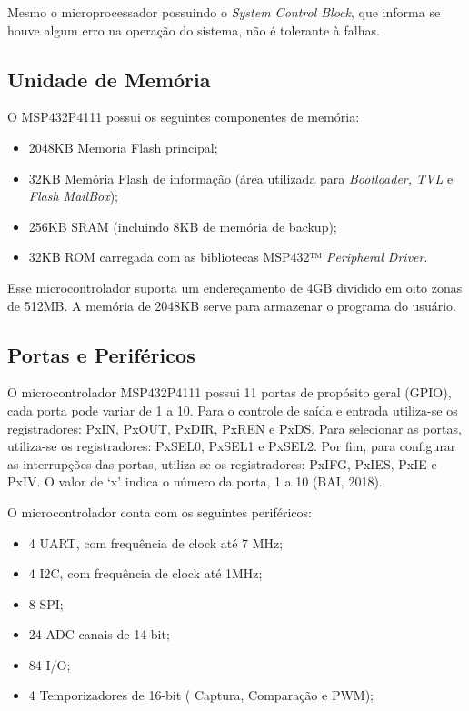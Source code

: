 Mesmo o microprocessador possuindo o \textit{System Control Block}, que informa se houve algum erro na operação do sistema, não é tolerante à falhas. 

\subsection{Unidade de Memória}

O MSP432P4111 possui os seguintes componentes de memória:

\begin{itemize}
\item 2048KB Memoria Flash principal;
\item 32KB Memória Flash de informação (área utilizada para \textit{Bootloader, TVL} e \textit{Flash MailBox});
\item 256KB SRAM (incluindo 8KB de memória de backup);
\item 32KB ROM carregada com as bibliotecas MSP432™ \textit{Peripheral Driver}.
\end{itemize}

Esse microcontrolador suporta um endereçamento de 4GB dividido em oito zonas de 512MB. A memória de 2048KB serve para armazenar o programa do usuário.

\subsection{Portas e Periféricos}

O microcontrolador MSP432P4111 possui 11 	portas de propósito geral (GPIO), cada porta pode variar de 1 a 10. Para o controle de saída e entrada utiliza-se os registradores: PxIN, PxOUT, PxDIR, PxREN e PxDS. Para selecionar as portas, utiliza-se os registradores: PxSEL0, PxSEL1 e PxSEL2. Por fim, para configurar as interrupções das portas, utiliza-se os registradores: PxIFG, PxIES, PxIE e PxIV. O valor de ‘x’ indica o número da porta, 1 a 10 (BAI, 2018).

O microcontrolador conta com os seguintes periféricos:

\begin{itemize}
\item 4 UART, com frequência de clock até 7 MHz;
\item 4 I2C, com frequência de clock até 1MHz;
\item 8 SPI;
\item 24 ADC canais de 14-bit;
\item 84 I/O;
\item 4 Temporizadores de 16-bit ( Captura, Comparação e PWM);
\end{itemize}

